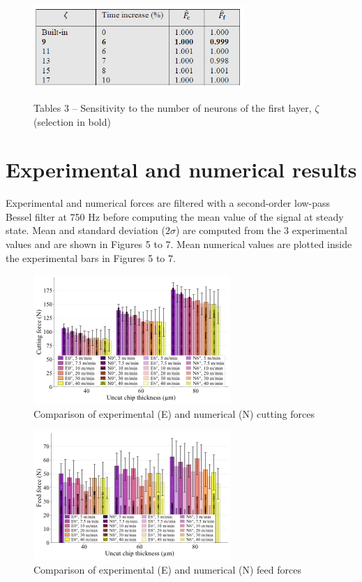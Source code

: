 \documentclass[final,5p,times,twocolumn]{elsarticle}
\begin{document}
\begin{figure}[h]
\centering
\caption{Tables 3 -- Sensitivity to the number of neurons of the first layer, $\zeta$ (selection in bold)}
\includegraphics[width = 8cm]{Figures/Tab3}
\label{Tab3}
\end{figure}

\section{Experimental and numerical results}
\label{Results}

Experimental and numerical forces are filtered with a second-order low-pass Bessel filter at 750 Hz before computing the mean value of the signal at steady state. Mean and standard deviation ($2\sigma$) are computed from the 3 experimental values and are shown in Figures 5 to 7. Mean numerical values are plotted inside the experimental bars in Figures 5 to 7.

\begin{figure}[h]
\centering
\includegraphics{Figures/Fc}
\caption{Comparison of experimental (E) and numerical (N) cutting forces}
\label{Fc}
\end{figure}

\begin{figure}[h]
\centering
\includegraphics{Figures/Ff}
\caption{Comparison of experimental (E) and numerical (N) feed forces}
\label{Ff}
\end{figure}
\end{document}
